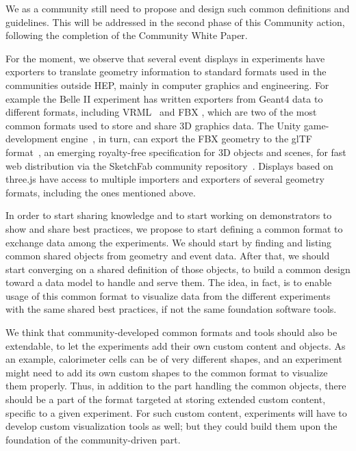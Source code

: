 \documentclass[12pt,a4paper]{article}
\begin{document}
We as a community still need to propose and design such common definitions and guidelines. This will
be addressed in the second phase of this Community action, following the completion of the Community White Paper.

For the moment, we observe that several event displays in experiments have exporters to translate geometry information to standard
formats used in the communities outside HEP, mainly in computer graphics and engineering. For example the Belle II experiment has
written exporters from Geant4 data to different formats, including VRML~\cite{vrml} and FBX \cite{BelleIIGeoExporters}, which are two of the most
common formats used to store and share 3D graphics data. The Unity game-development engine~\cite{Unity3D}, in turn, can export the
FBX geometry to the glTF format~\cite{glTF}, an emerging royalty-free specification for 3D objects and scenes, for fast web distribution
via the SketchFab community repository~\cite{SketchFabBelleII,SketchFab}. Displays based on three.js have access to multiple importers and exporters
of several geometry formats, including the ones mentioned above. %

In order to start sharing knowledge and to start working on demonstrators to show and share best practices, we propose to start
defining a common format to exchange data among the experiments. We should start by finding and listing common shared objects from
geometry and event data. After that, we should start converging on a shared definition of those objects, to build a common design
toward a data model to handle and serve them. The idea, in fact, is to enable usage of this common format to visualize data from
the different experiments with the same shared best practices, if not the same foundation software tools.

We think that community-developed common formats and tools should also be extendable, to let the experiments add their own custom
content and objects. As an example, calorimeter cells can be of very different shapes, and an experiment might need to add its own
custom shapes to the common format to visualize them properly. Thus, in addition to the part handling the common objects, there should
be a part of the format targeted at storing extended custom content, specific to a given experiment. For such custom content,
experiments will have to develop custom visualization tools as well; but they could build them upon the foundation
of the community-driven part.
\end{document}
